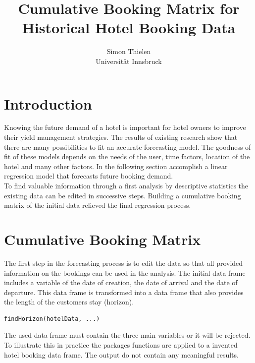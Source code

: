 \documentclass[nojss]{jss}
\author{Simon Thielen\\Universit\"at Innsbruck}
\title{Cumulative Booking Matrix for Historical Hotel Booking Data}
\begin{document}


\section{Introduction}

Knowing the future demand of a hotel is important for hotel owners to improve their yield management strategies. The results of existing research show that there are many possibilities to fit an accurate forecasting model. The goodness of fit of these models depends on the needs of the user, time factors, location of the hotel and many other factors. In the following section accomplish a linear regression model that forecasts future booking demand. \\
To find valuable information through a first analysis by descriptive statistics the existing data can be edited in successive steps. Building a cumulative booking matrix of the initial data relieved the final regression process.


\section{Cumulative Booking Matrix}

The first step in the forecasting process is to edit the data so that all provided information on the bookings can be used in the analysis. The initial data frame includes a variable of the date of creation, the date of arrival and the date of departure. This data frame is transformed into a data frame that also provides the length of the customers stay (horizon).

\begin{verbatim}
findHorizon(hotelData, ...)
\end{verbatim}

The used data frame must contain the three main variables or it will be rejected.\\
To illustrate this in practice the packages functions are applied to a invented hotel booking data frame. The output do not contain any meaningful results.
\end{document}
